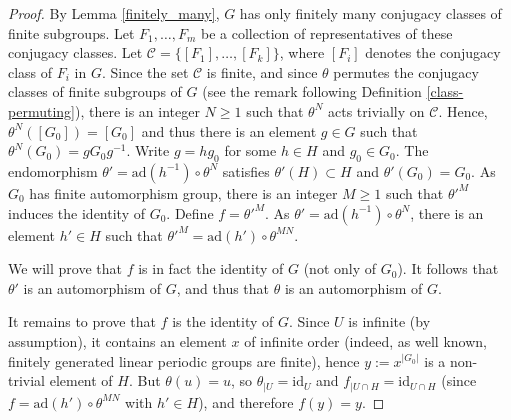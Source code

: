 \documentclass[a4paper, 11pt]{amsart}
\theoremstyle{definition}
\theoremstyle{remark}
\renewcommand{\geq}{\geqslant}
\begin{document}
\begin{proof}
By Lemma \ref{finitely_many}, $G$ has only finitely many conjugacy classes of finite subgroups. Let $F_1,\ldots,F_m$ be a collection of representatives of these conjugacy classes. Let $\mathcal{C}=\lbrace [F_1],\ldots,[F_k]\rbrace$, where $[F_i]$ denotes the conjugacy class of $F_i$ in $G$. Since the set $\mathcal{C}$ is finite, and since $\theta$ permutes the conjugacy classes of finite subgroups of $G$ (see the remark following Definition \ref{class-permuting}), there is an integer $N\geq 1$ such that $\theta^N$ acts trivially on $\mathcal{C}$. Hence, $\theta^N([G_0])=[G_0]$ and thus there is an element $g\in G$ such that $\theta^N(G_0)=gG_0g^{-1}$. Write $g=hg_0$ for some $h\in H$ and $g_0\in G_0$. The endomorphism $\theta'=\mathrm{ad}(h^{-1})\circ \theta^N$ satisfies $\theta'(H)\subset H$ and $\theta'(G_0)=G_0$. As $G_0$ has finite automorphism group, there is an integer $M\geq 1$ such that $\theta'^M$ induces the identity of $G_0$. Define $f=\theta'^M$. As $\theta'=\mathrm{ad}(h^{-1})\circ \theta^N$, there is an element $h'\in H$ such that $\theta'^M=\mathrm{ad}(h')\circ \theta^{MN}$.

\smallskip \noindent
We will prove that $f$ is in fact the identity of $G$ (not only of $G_0$). It follows that $\theta'$ is an automorphism of $G$, and thus that $\theta$ is an automorphism of $G$.


\smallskip \noindent
It remains to prove that $f$ is the identity of $G$. Since $U$ is infinite (by assumption), it contains an element $x$ of infinite order (indeed, as well known, finitely generated linear periodic groups are finite), hence $y:=x^{\vert G_0\vert}$ is a non-trivial element of $H$. But $\theta(u)=u$, so $\theta_{\vert U}=\mathrm{id}_{ U}$ and $f_{\vert U\cap H}=\mathrm{id}_{U\cap H}$ (since $f=\mathrm{ad}(h')\circ \theta^{MN}$ with $h'\in H$), and therefore $f(y)=y$.


\end{proof}
\end{document}
